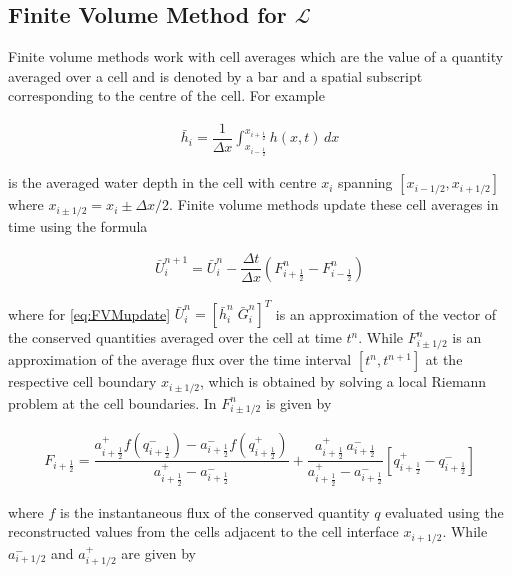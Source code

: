 \documentclass[SingleSpace,12pt,Proceedings]{Serre_ASCE}
\begin{document}
\subsection{Finite Volume Method for $\mathcal{L}$}
\label{section:conservativeL}
Finite volume methods work with cell averages which are the value of a quantity averaged over a cell and is denoted by a bar and a spatial subscript corresponding to the centre of the cell. For example
\begin{linenomath*}
\begin{gather*}
\bar{h}_i = \dfrac{1}{\Delta x} \int_{x_{i-\frac{1}{2}}}^{x_{i+\frac{1}{2}}} h(x,t) \, dx 
\end{gather*}
\end{linenomath*}
is the averaged water depth in the cell with centre $x_i$ spanning $\left[x_{i - 1/2} , x_{i + 1/2}\right]$ where $x_{i \pm 1/2} = x_i \pm \Delta x/2$. Finite volume methods update these cell averages in time using the formula
\begin{linenomath*}
\begin{gather}\label{eq:FVMupdate}
\bar{U}^{n+1}_i = \bar{U}^{n}_i - \dfrac{\Delta t}{\Delta x} \left(F^n_{i+ \frac{1}{2}} - F^n_{i - \frac{1}{2}} \right)
\end{gather}
\end{linenomath*}
where for \eqref{eq:FVMupdate} $\bar{U}^{n}_i = \left[ \bar{h}^{n}_i \; \bar{G}^{n}_i \right] ^T$ is an approximation of the vector of the conserved quantities averaged over the cell at time $t^n$. While $F^n_{i\pm 1/2}$ is an approximation of the average flux over the time interval $[t^n, t^{n+1}]$ at the respective cell boundary $x_{i \pm 1/2 }$, which is obtained by solving a local Riemann problem at the cell boundaries.  In  $F^n_{i\pm 1/2}$ is given by
\begin{linenomath*}
\begin{gather}\label{eq:HLL_flux}
F_{i+\frac{1}{2}} = \dfrac{a^+_{i+\frac{1}{2}} f\left(q^-_{i+\frac{1}{2}}\right) - a^-_{i+\frac{1}{2}} f\left(q^+_{i+\frac{1}{2}}\right)}{a^+_{i+\frac{1}{2}} - a^-_{i+\frac{1}{2}}}  + \dfrac{a^+_{i+\frac{1}{2}} \, a^-_{i+\frac{1}{2}}}{a^+_{i+\frac{1}{2}} - a^-_{i+\frac{1}{2}}} \left [ q^+_{i+\frac{1}{2}} - q^-_{i+\frac{1}{2}} \right ]
\end{gather}
\end{linenomath*}
where $f$ is the instantaneous flux of the conserved quantity $q$ evaluated using the reconstructed values from the cells adjacent to the cell interface $x_{i + 1/2}$. While $a^-_{i+1/2}$ and $a^+_{i+1/2}$ are given by
\end{document}
